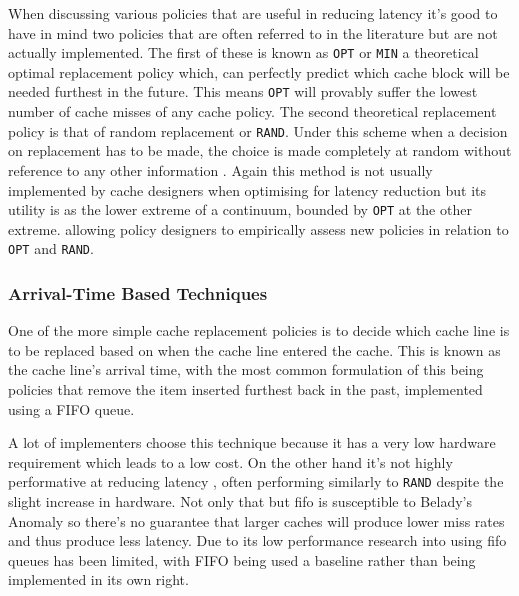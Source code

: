 When discussing various policies that are useful in reducing latency it's good to have in mind two policies that are often referred to in the literature but are not actually implemented. The first of these is known as \texttt{OPT} or \texttt{MIN} \cite{jeongOptimalReplacementsCaches1999} a theoretical optimal replacement policy which, can perfectly predict which cache block will be needed furthest in the future. This means \texttt{OPT} will provably suffer the lowest number of cache misses of any cache policy. The second theoretical replacement policy is that of random replacement or \texttt{RAND}. Under this scheme when a decision on replacement has to be made, the choice is made completely at random without reference to any other information \cite{beladyStudyReplacementAlgorithms1966}. Again this method is not usually implemented by cache designers when optimising for latency reduction \cite{karedlaCachingStrategiesImprove1994} but its utility is as the lower extreme of a continuum, bounded by \texttt{OPT} at the other extreme. allowing policy designers to empirically assess new policies in relation to \texttt{OPT} and \texttt{RAND}.

\subsubsection{Arrival-Time Based Techniques}

One of the more simple cache replacement policies is to decide which cache line is to be replaced based on when the cache line entered the cache. This is known as the cache line's arrival time, with the most common formulation of this being policies that remove the item inserted furthest back in the past, implemented using a FIFO queue.

A lot of implementers choose this technique because it has a very low hardware requirement \cite{pandaSurveyReplacementStrategies2016} which leads to a low cost. On the other hand it's not highly performative at reducing latency \cite{al-zoubiPerformanceEvaluationCache2004, tsaoMultiFactorPagingExperiment1972}, often performing similarly to \texttt{RAND} despite the slight increase in hardware. Not only that but \gls{fifo} is susceptible to Belady's Anomaly \cite{beladyAnomalySpacetimeCharacteristics1969} so there's no guarantee that larger caches will produce lower miss rates and thus produce less latency. Due to its low performance research into using \gls{fifo} queues has been limited, with \gls{FIFO} being used a baseline \cite{faresPerformanceEvaluationTraditional2012} rather than being implemented in its own right.


